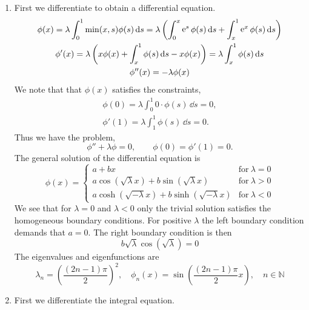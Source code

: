 \begin{Solution}
  \begin{enumerate}
  \item
    First we differentiate to obtain a differential equation.
    \begin{gather*}
      \phi(x)
      = \lambda \int_0^1 \min(x,s) \phi(s) \,\mathrm{d} s 
      = \lambda \left( \int_0^x \mathop{\mathrm{e}}\nolimits^s \phi(s) \,\mathrm{d} s 
        + \int_x^1 \mathop{\mathrm{e}}\nolimits^x \phi(s) \,\mathrm{d} s \right) \\
      \phi'(x) 
      = \lambda \left( x \phi(x) + \int_x^1 \phi(s) \,\mathrm{d} s - x \phi(x) \right)
      = \lambda \int_x^1 \phi(s) \,\mathrm{d} s \\
      \phi''(x) = - \lambda \phi(x)
    \end{gather*}
    We note that that $\phi(x)$ satisfies the constraints,
    \begin{gather*}
      \phi(0) = \lambda \int_0^1 0 \cdot \phi(s) \,\dd s = 0, \\
      \phi'(1) = \lambda \int_1^1 \phi(s) \,\dd s = 0. 
    \end{gather*}
    Thus we have the problem,
    \[
    \phi'' + \lambda \phi = 0, \qquad
    \phi(0) = \phi'(1) = 0.
    \]
    The general solution of the differential equation is
    \[
    \phi(x) = 
    \begin{cases}
      a + b x &\mathrm{for}\ \lambda = 0 \\
      a \cos \left( \sqrt{\lambda} x \right) 
      + b \sin \left( \sqrt{\lambda} x \right) 
      &\mathrm{for}\ \lambda > 0 \\
      a \cosh \left( \sqrt{-\lambda} x \right) 
      + b \sinh \left( \sqrt{-\lambda} x \right) 
      &\mathrm{for}\ \lambda < 0
    \end{cases}
    \]
    We see that for $\lambda = 0$ and $\lambda < 0$ only the trivial solution
    satisfies the homogeneous boundary conditions.  For positive $\lambda$ the 
    left boundary condition demands that $a = 0$.  The right boundary condition is
    then
    \[
    b \sqrt{\lambda} \cos \left( \sqrt{\lambda} \right) = 0
    \]
    The eigenvalues and eigenfunctions are
    \[
    \boxed{
      \lambda_n = \left( \frac{ (2n-1) \pi }{ 2 } \right)^2, \quad
      \phi_n(x) = \sin \left( \frac{ (2n-1) \pi }{ 2 } x \right), \quad
      n \in \mathbb{N}
      }
    \]
  \item
    First we differentiate the integral equation.
    \begin{align*}

\end{align*}
\end{enumerate}
\end{Solution}
